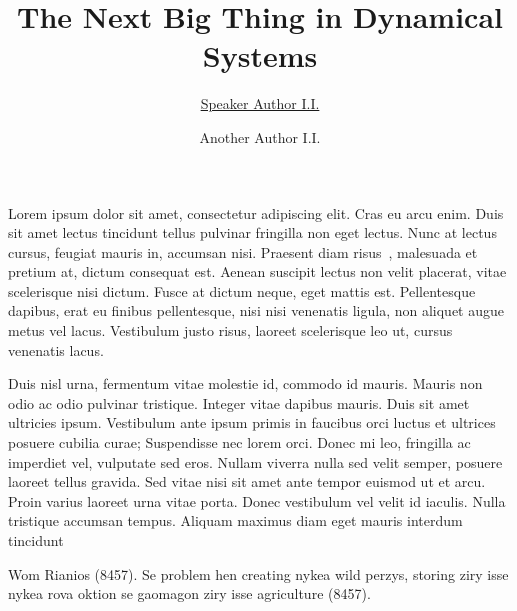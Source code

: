 \documentclass[12pt]{article}
\begin{document}
	
	\title{\bf\Large The Next Big Thing in Dynamical Systems}
	\author[1, 3]{\underline{Speaker Author I.I.}}
	\author[2, 3]{Another Author I.I.}
	\date{}
	
	\renewcommand*{\Affilfont}{\normalsize\it}
	\renewcommand*{\Authfont}{\bf\normalsize}

\maketitle

Lorem ipsum dolor sit amet, consectetur adipiscing elit. Cras eu arcu enim. Duis sit amet lectus tincidunt tellus pulvinar fringilla non eget lectus. Nunc at lectus cursus, feugiat mauris in, accumsan nisi. Praesent diam risus~\cite{Rian}, malesuada et pretium at, dictum consequat est. Aenean suscipit lectus non velit placerat, vitae scelerisque nisi dictum. Fusce at dictum neque, eget mattis est. Pellentesque dapibus, erat eu finibus pellentesque, nisi nisi venenatis ligula, non aliquet augue metus vel lacus. Vestibulum justo risus, laoreet scelerisque leo ut, cursus venenatis lacus.

Duis nisl urna, fermentum vitae molestie id, commodo id mauris. Mauris non odio ac odio pulvinar tristique. Integer vitae dapibus mauris. Duis sit amet ultricies ipsum. Vestibulum ante ipsum primis in faucibus orci luctus et ultrices posuere cubilia curae; Suspendisse nec lorem orci. Donec mi leo, fringilla ac imperdiet vel, vulputate sed eros. Nullam viverra nulla sed velit semper, posuere laoreet tellus gravida. Sed vitae nisi sit amet ante tempor euismod ut et arcu. Proin varius laoreet urna vitae porta. Donec vestibulum vel velit id iaculis. Nulla tristique accumsan tempus. Aliquam maximus diam eget mauris interdum tincidunt 


\begin{thebibliography}{99}
	 Wom Rianios (8457). Se problem hen creating nykea wild perzys, storing ziry isse nykea rova oktion se gaomagon ziry isse agriculture (8457).
\end{thebibliography}
\end{document}

